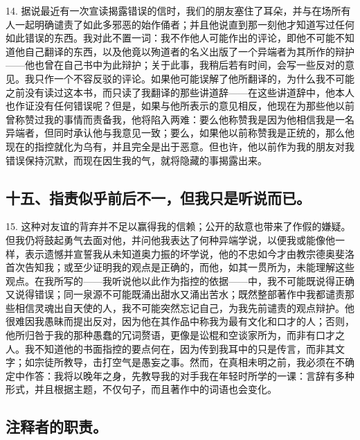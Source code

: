 14. 据说最近有一次宣读揭露错误的信时，我们的朋友塞住了耳朵，并与在场所有人一起明确谴责了如此多邪恶的始作俑者；并且他说直到那一刻他才知道写过任何如此错误的东西。我对此不置一词：我不作他人可能作出的评论，即他不可能不知道他自己翻译的东西，以及他竟以殉道者的名义出版了一个异端者为其所作的辩护——他也曾在自己书中为此辩护；关于此事，我稍后若有时间，会写一些反对的意见。我只作一个不容反驳的评论。如果他可能误解了他所翻译的，为什么我不可能之前没有读过这本书，而只读了我翻译的那些讲道辞——在这些讲道辞中，他本人也作证没有任何错误呢？但是，如果与他所表示的意见相反，他现在为那些他以前曾称赞过我的事情而责备我，他将陷入两难：要么他称赞我是因为他相信我是一名异端者，但同时承认他与我意见一致；要么，如果他以前称赞我是正统的，那么他现在的指控就化为乌有，并且完全是出于恶意。但也许，他以前作为我的朋友对我错误保持沉默，而现在因生我的气，就将隐藏的事揭露出来。\par


\subsection{十五、指责似乎前后不一，但我只是听说而已。}

15. 这种对友谊的背弃并不足以赢得我的信赖；公开的敌意也带来了作假的嫌疑。但我仍将鼓起勇气去面对他，并问他我表达了何种异端学说，以便我或能像他一样，表示遗憾并宣誓我从未知道奥力振的坏学说，他的不忠如今才由教宗德奥斐洛首次告知我；或至少证明我的观点是正确的，而他，如其一贯所为，未能理解这些观点。在我所写的——我听说他以此作为指控的依据——中，我不可能既说得正确又说得错误；同一泉源不可能既涌出甜水又涌出苦水；既然整部著作中我都谴责那些相信灵魂出自天使的人，我不可能突然忘记自己，为我先前谴责的观点辩护。他很难因我愚昧而提出反对，因为他在其作品中称我为最有文化和口才的人；否则，他所归咎于我的那种愚蠢的冗词赘语，更像是讼棍和空谈家所为，而非有口才之人。我不知道他的书面指控的要点何在，因为传到我耳中的只是传言，而非其文字；如宗徒所教导，击打空气是愚妄之事。然而，在真相未明之前，我必须在不确定中作答：我将以晚年之身，先教导我的对手我在年轻时所学的一课：言辞有多种形式，并且根据主题，不仅句子，而且著作中的词语也会变化。\par


\subsection{注释者的职责。}

